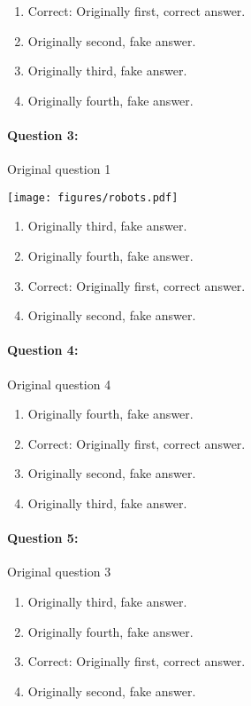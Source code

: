 \documentclass[9pt, twoside, twocolumn]{extarticle}
\renewcommand{\includegraphics}[2][]{\OldIncludegraphics[width=\linewidth, #1]{#2}}
\renewcommand{\caption}{}
\let\origfigure=\figure
\let\endorigfigure=\endfigure
\renewenvironment{figure}[1][]{%
  \origfigure[H]
}{%
  \endorigfigure
}
\begin{document}
\begin{enumerate}[label=\textbf{{\Alph*}},labelindent=0pt, labelsep=1.5em, parsep=0.2em]
\item Correct: Originally first, correct answer.
\item Originally second, fake answer.
\item Originally third, fake answer.
\item Originally fourth, fake answer.
\end{enumerate}
\paragraph{Question 3:}
Original question 1

\begin{figure}\centering
\texttt{[image: figures/robots.pdf]}
\caption{\end{figure}
\begin{enumerate}[label=\textbf{{\Alph*}},labelindent=0pt, labelsep=1.5em, parsep=0.2em]
\item Originally third, fake answer.
\item Originally fourth, fake answer.
\item Correct: Originally first, correct answer.
\item Originally second, fake answer.
\end{enumerate}
\paragraph{Question 4:}
Original question 4

\begin{enumerate}[label=\textbf{{\Alph*}},labelindent=0pt, labelsep=1.5em, parsep=0.2em]
\item Originally fourth, fake answer.
\item Correct: Originally first, correct answer.
\item Originally second, fake answer.
\item Originally third, fake answer.
\end{enumerate}
\paragraph{Question 5:}
Original question 3

\begin{enumerate}[label=\textbf{{\Alph*}},labelindent=0pt, labelsep=1.5em, parsep=0.2em]
\item Originally third, fake answer.
\item Originally fourth, fake answer.
\item Correct: Originally first, correct answer.
\item Originally second, fake answer.
\end{enumerate}
\end{document}
